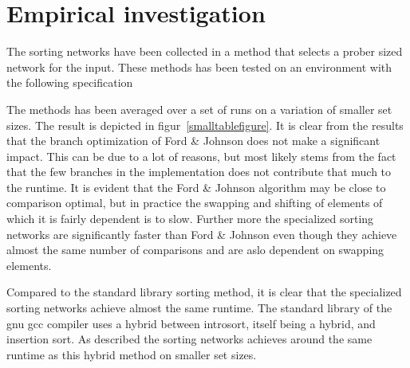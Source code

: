 \section{Empirical investigation}
The sorting networks have been collected in a method that selects a prober sized network for the input. These methods has been tested on an environment with the following specification


The methods has been averaged over a set of runs on a variation of smaller set sizes. The result is depicted in figur~\ref{smalltablefigure}. It is clear from the results that the branch optimization of Ford \& Johnson does not make a significant impact. This can be due to a lot of reasons, but most likely stems from the fact that the few branches in the implementation does not contribute that much to the runtime. It is evident that the Ford \& Johnson algorithm may be close to comparison optimal, but in practice the swapping and shifting of elements of which it is fairly dependent is to slow. Further more the specialized sorting networks are significantly faster than Ford \& Johnson even though they achieve almost the same number of comparisons and are aslo dependent on swapping elements.

Compared to the standard library sorting method, it is clear that the specialized sorting networks achieve almost the same runtime. The standard library of the gnu gcc compiler uses a hybrid between introsort, itself being a hybrid, and insertion sort\cite{gnustd}. As described the sorting networks achieves around the same runtime as this hybrid method on smaller set sizes.

